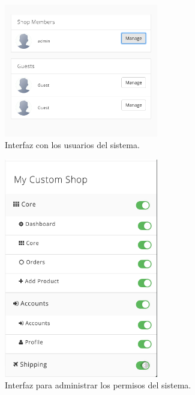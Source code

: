 	\begin{figure}[H]
		\centering
		\includegraphics[width=0.6\textwidth]{figuras/dashboard/account/users.png}
		\caption{Interfaz con los usuarios del sistema.}
		\label{figure:dashboard:account:users}
	\end{figure}


	\begin{figure}[H]
		\centering
		\includegraphics[width=0.6\textwidth]{figuras/dashboard/account/permisos.png}
		\caption{Interfaz para administrar los permisos del sistema.}
		\label{figure:dashboard:account:permisos}
	\end{figure}

